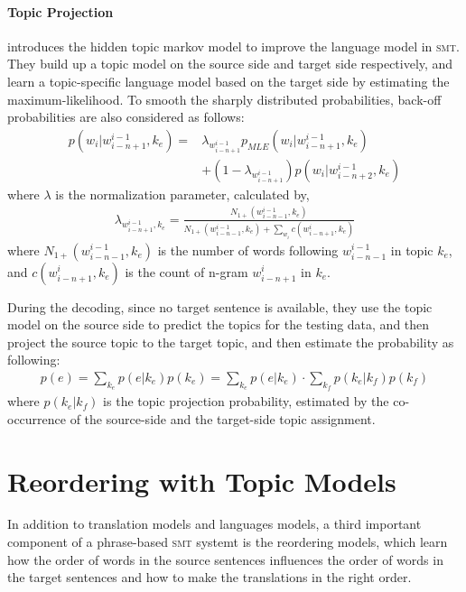 
\paragraph{Topic Projection}

\citet{Yu-2013} introduces the hidden topic markov model to improve
the language model in \textsc{smt}. They build up a topic model on the
source side and target side respectively, and learn a topic-specific
language model based on the target side by estimating the
maximum-likelihood. To smooth the sharply distributed probabilities,
back-off probabilities are also considered as follows:
\begin{align}
p(w_i | w^{i-1}_{i-n+1}, k_e) = &\lambda_{w^{i-1}_{i-n+1}} p_{MLE}(w_i|w^{i-1}_{i-n+1}, k_e) \\
&+ (1- \lambda_{w^{i-1}_{i-n+1}})p(w_i|w^{i-1}_{i-n+2}, k_e)
\end{align}
where $\lambda$ is the normalization parameter, calculated by,
\begin{align}
\lambda_{w^{i-1}_{i-n+1}, k_e} = \frac{N_{1+}(w^{i-1}_{i-n-1},
  k_e)}{N_{1+}(w^{i-1}_{i-n-1}, k_e) + \sum_{w_i}c(w^i_{i-n+1}, k_e)}
\end{align}
where $N_{1+}(w^{i-1}_{i-n-1}, k_e)$ is the number of words following
$w^{i-1}_{i-n-1}$ in topic $k_e$, and $c(w^i_{i-n+1}, k_e)$ is the
count of n-gram $w^i_{i-n+1}$ in $k_e$.

During the decoding, since no target sentence is available, they use
the topic model on the source side to predict the topics for the
testing data, and then project the source topic to the target topic,
and then estimate the probability as following:
\begin{align}
p(e) = \sum_{k_e} p(e|k_e) p(k_e) = \sum_{k_e} p(e|k_e) \cdot \sum_{k_f} p(k_e|k_f) p (k_f)
\end{align}
where $p(k_e|k_f)$ is the topic projection probability, estimated by
the co-occurrence of the source-side and the target-side topic
assignment.


\section{Reordering with Topic Models}

In addition to translation models and languages models, a third
important component of a phrase-based \textsc{smt} systemt is the
reordering models, which learn how the order of words in the source
sentences influences the order of words in the target sentences and
how to make the translations in the right order.

